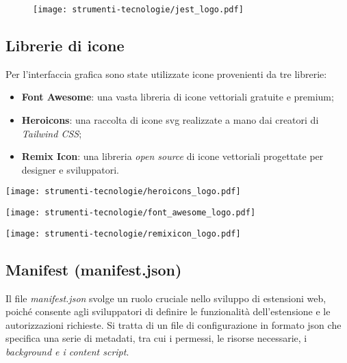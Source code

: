 \begin{figure}[H]
    \centering 
    \texttt{[image: strumenti-tecnologie/jest\_logo.pdf]} 
\end{figure}

\subsection*{Librerie di icone}

\par Per l’interfaccia grafica sono state utilizzate icone provenienti da tre librerie:
\begin{itemize}
  \item \textbf{Font Awesome}: una vasta libreria di icone vettoriali gratuite e premium;
  \item \textbf{Heroicons}: una raccolta di icone \gls{svg} realizzate a mano dai creatori di \textit{Tailwind CSS};
  \item \textbf{Remix Icon}: una libreria \textit{open source} di icone vettoriali progettate per designer e sviluppatori.
\end{itemize}

\vspace{5pt}
\begin{center}
  \begin{minipage}{0.3\columnwidth}
    \centering
    \texttt{[image: strumenti-tecnologie/heroicons\_logo.pdf]} 
  \end{minipage}
  \hfill
  \begin{minipage}{0.3\columnwidth}
    \centering
    \texttt{[image: strumenti-tecnologie/font\_awesome\_logo.pdf]} 
  \end{minipage}
  \hfill
  \begin{minipage}{0.3\columnwidth}
    \centering
    \texttt{[image: strumenti-tecnologie/remixicon\_logo.pdf]} 
  \end{minipage}
\end{center}
\vspace{5pt}

\subsection*{Manifest (manifest.json)}

\par Il file \textit{manifest.json} svolge un ruolo cruciale nello sviluppo di estensioni web, poiché consente agli sviluppatori di definire le funzionalità dell’estensione e le autorizzazioni richieste. Si tratta di un file di configurazione in formato \gls{json} che specifica una serie di metadati, tra cui i permessi, le risorse necessarie, i \textit{background e i content script}.

